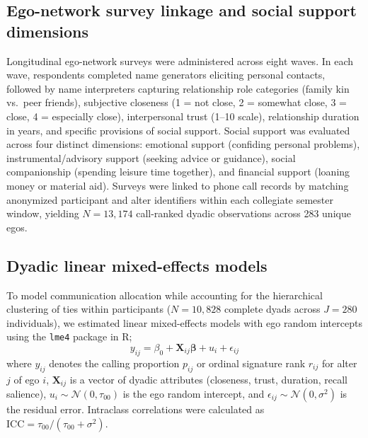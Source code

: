 \documentclass[11pt,letterpaper]{article}
\begin{document}
\subsection*{Ego-network survey linkage and social support dimensions}
Longitudinal ego-network surveys were administered across eight waves. In each wave, respondents completed name generators eliciting personal contacts, followed by name interpreters capturing relationship role categories (family kin vs.\ peer friends), subjective closeness (1 = not close, 2 = somewhat close, 3 = close, 4 = especially close), interpersonal trust (1--10 scale), relationship duration in years, and specific provisions of social support. Social support was evaluated across four distinct dimensions: emotional support (confiding personal problems), instrumental/advisory support (seeking advice or guidance), social companionship (spending leisure time together), and financial support (loaning money or material aid). Surveys were linked to phone call records by matching anonymized participant and alter identifiers within each collegiate semester window, yielding $N = 13,174$ call-ranked dyadic observations across 283 unique egos.

\subsection*{Dyadic linear mixed-effects models}
To model communication allocation while accounting for the hierarchical clustering of ties within participants ($N = 10,828$ complete dyads across $J = 280$ individuals), we estimated linear mixed-effects models with ego random intercepts using the \texttt{lme4} package\cite{bates2015fitting} in \textsf{R};\cite{Rmanual}
\begin{equation}
y_{ij} = \beta_0 + \mathbf{X}_{ij}\boldsymbol{\beta} + u_i + \epsilon_{ij}
\end{equation}
where $y_{ij}$ denotes the calling proportion $p_{ij}$ or ordinal signature rank $r_{ij}$ for alter $j$ of ego $i$, $\mathbf{X}_{ij}$ is a vector of dyadic attributes (closeness, trust, duration, recall salience), $u_i \sim \mathcal{N}(0, \tau_{00})$ is the ego random intercept, and $\epsilon_{ij} \sim \mathcal{N}(0, \sigma^2)$ is the residual error. Intraclass correlations were calculated as $\text{ICC} = \tau_{00} / (\tau_{00} + \sigma^2)$.
\end{document}
